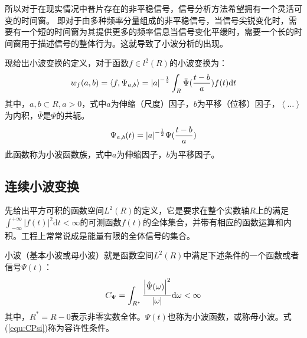 所以对于在现实情况中普片存在的非平稳信号，信号分析方法希望拥有一个灵活可变的时间窗。 即对于由多种频率分量组成的非平稳信号，当信号尖锐变化时，需要有一个短的时间窗为其提供更多的频率信息当信号变化平缓时，需要一个长的时间窗用于描述信号的整体行为。这就导致了小波分析的出现。

现给出小波变换的定义，对于函数$f\in l^2(R)$的小波变换为：
\begin{equation}
	w_{f}(a,b) = \left\langle f,\Psi_{a,b}\right\rangle = {\left| a\right| }^{-{1\over2}}  \int_R \bar{\Psi}({t-b\over a}) f(t) \mathrm{d}t
\end{equation}
其中，$ a,b \subset R , a>0$，式中$a$为伸缩（尺度）因子，$b$为平移（位移）因子，$\left\langle \dots\right\rangle$为内积，${\bar{\Psi}}$是$\Psi$的共轭。
\begin{equation}
	\Psi_{a,b}(t) = {\left| a\right| }^{-{1\over2}} \Psi({t-b\over a})
\end{equation}
此函数称为小波函数族，式中$a$为伸缩因子，$b$为平移因子。

\subsection{连续小波变换}
先给出平方可积的函数空间$ L^2(R) $的定义，它是要求在整个实数轴$R$上的满足$ \int_{-\infty}^{+\infty}\left|f(t)\right|^2\mathrm{d}t < \infty $的可测函数$f(t)$的全体集合，并带有相应的函数运算和内积。工程上常常说成是能量有限的全体信号的集合。

小波（基本小波或母小波）就是函数空间$ L^2(R) $中满足下述条件的一个函数或者信号$\Psi(t)$：
\begin{equation}
\label{equ:CPsi}
	C_{\Psi} = \int_{R^*} 
	{{\left|\hat{\Psi}(\omega) \right|}^2 \over \left| \omega \right| }
	 \mathrm{d}\omega < \infty
\end{equation}
其中，$R^{*}=R-{0}$表示非零实数全体。$\Psi(t)$也称为小波函数，或称母小波。式(\ref{equ:CPsi})称为容许性条件。

